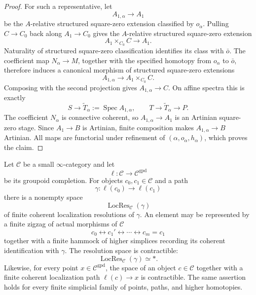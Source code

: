 \begin{proof}
For such a representative, let
\[
    A_{1,\alpha}\longrightarrow A_1
\]
be the $A$-relative structured square-zero extension classified by
$o_\alpha$.  Pulling $C\to C_0$ back along $A_1\to C_0$ gives the
$A$-relative structured square-zero extension
\[
    A_1\times_{C_0}C\longrightarrow A_1.
\]
Naturality of structured square-zero classification identifies its class with
$\bar o$.  The coefficient map $N_\alpha\to M$, together with the specified
homotopy from $o_\alpha$ to $\bar o$, therefore induces a canonical morphism
of structured square-zero extensions
\[
    A_{1,\alpha}
    \longrightarrow
    A_1\times_{C_0}C.
\]
Composing with the second projection gives $A_{1,\alpha}\to C$.  On affine
spectra this is exactly
\[
    S\longrightarrow\widetilde T_\alpha:=\operatorname{Spec}A_{1,\alpha},
    \qquad
    T\longrightarrow\widetilde T_\alpha\longrightarrow P.
\]
The coefficient $N_\alpha$ is connective coherent, so
$A_{1,\alpha}\to A_1$ is an Artinian square-zero stage.  Since $A_1\to B$ is
Artinian, finite composition makes $A_{1,\alpha}\to B$ Artinian.  All maps are
functorial under refinement of $(\alpha,o_\alpha,h_\alpha)$, which proves the
claim.
\end{proof}

\begin{lemma}
\label{lem:bnli-finite-zigzag-resolution}
Let $\mathcal C$ be a small $\infty$-category and let
\[
    \ell:\mathcal C\longrightarrow\mathcal C^{\mathrm{gpd}}
\]
be its groupoid completion.  For objects $c_0,c_1\in\mathcal C$ and a path
\[
    \gamma:\ell(c_0)\longrightarrow\ell(c_1)
\]
there is a nonempty space
\[
    \operatorname{LocRes}_{\mathcal C}(\gamma)
\]
of finite coherent localization resolutions of $\gamma$.  An element may be
represented by a finite zigzag of actual morphisms of $\mathcal C$
\[
    c_0
    \longleftrightarrow c_1'
    \longleftrightarrow\cdots
    \longleftrightarrow c_m=c_1
\]
together with a finite hammock of higher simplices recording its coherent
identification with $\gamma$.  The resolution space is contractible:
\[
\boxed{
    \operatorname{LocRes}_{\mathcal C}(\gamma)\simeq *.}
\]
Likewise, for every point $x\in\mathcal C^{\mathrm{gpd}}$, the space of an
object $c\in\mathcal C$ together with a finite coherent localization path
$\ell(c)\to x$ is contractible.  The same assertion holds for every finite
simplicial family of points, paths, and higher homotopies.
\end{lemma}

